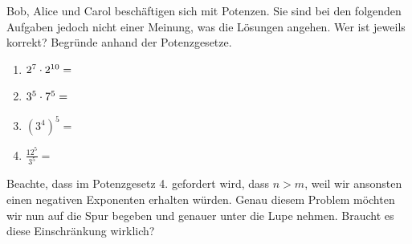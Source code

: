 \documentclass[11pt,oneside]{article}
\begin{document}
	\begin{aufgabe}
		Bob, Alice und Carol beschäftigen sich mit Potenzen. Sie sind bei den folgenden Aufgaben jedoch nicht einer Meinung, was die Lösungen angehen. Wer ist jeweils korrekt? Begründe anhand der Potenzgesetze.
		\begin{enumerate}[label=\alph*)]
			\item$2^7\cdot2^{10}=$\begin{enumerate}\end{enumerate}
			\item$3^5\cdot7^5=$\begin{enumerate}\end{enumerate}
			\item$\left(3^4\right)^5=$\begin{enumerate}\end{enumerate}
			\item$\frac{12^5}{3^5}=$\begin{enumerate}\end{enumerate}
		\end{enumerate}
	\end{aufgabe}
	Beachte, dass im Potenzgesetz 4. gefordert wird, dass $n>m$, weil wir ansonsten einen negativen Exponenten erhalten würden. Genau diesem Problem möchten wir nun auf die Spur begeben und genauer unter die Lupe nehmen. Braucht es diese Einschränkung wirklich?\\
\end{document}
